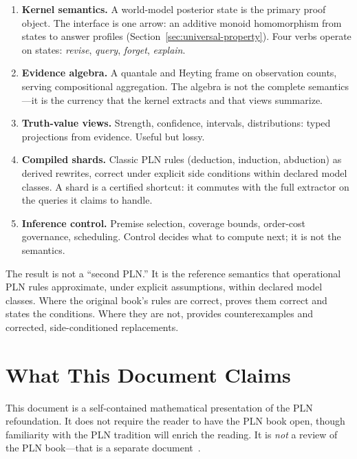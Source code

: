 \documentclass[11pt,openany]{report}
\begin{document}
\begin{enumerate}
\item \textbf{Kernel semantics.}  A world-model posterior state is the
  primary proof object.  The interface is one arrow: an additive monoid
  homomorphism from states to answer profiles
  (Section~\ref{sec:universal-property}).  Four verbs operate on
  states: \emph{revise}, \emph{query}, \emph{forget},
  \emph{explain}.

\item \textbf{Evidence algebra.}  A quantale and Heyting frame on
  observation counts, serving compositional aggregation.  The algebra
  is not the complete semantics---it is the currency that the kernel
  extracts and that views summarize.

\item \textbf{Truth-value views.}  Strength, confidence, intervals,
  distributions: typed projections from evidence.  Useful but lossy.

\item \textbf{Compiled shards.}  Classic PLN rules (deduction,
  induction, abduction) as derived rewrites, correct under explicit
  side conditions within declared model classes.  A shard is a
  certified shortcut: it commutes with the full extractor on the
  queries it claims to handle.

\item \textbf{Inference control.}  Premise selection, coverage bounds,
  order-cost governance, scheduling.  Control decides what to compute
  next; it is not the semantics.
\end{enumerate}

The result is not a ``second PLN.''  It is the reference semantics that
operational PLN rules approximate, under explicit assumptions, within declared
model classes.  Where the original book's rules are correct, \xiPLN{} proves
them correct and states the conditions.  Where they are not, \xiPLN{} provides
counterexamples and corrected, side-conditioned replacements.

\section{What This Document Claims}

This document is a self-contained mathematical presentation of the PLN
refoundation.  It does not require the reader to have the PLN book open,
though familiarity with the PLN tradition will enrich the reading.  It is
\emph{not} a review of the PLN book---that is a separate
document~\cite{plnReview2026}.
\end{document}

